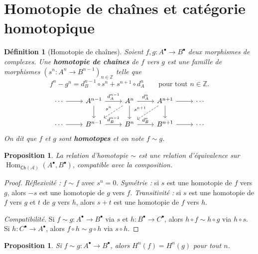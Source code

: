 \documentclass[a4paper,12pt]{book}
\DeclareMathOperator{\Hom}{Hom}
\newcommand{\Z}{\mathbb{Z}}
\newtheorem{proposition}[theoreme]{Proposition}
\newtheorem{definition}[theoreme]{Définition}
\begin{document}
\section{Homotopie de chaînes et catégorie homotopique}%
\label{sec:chain-homotopy}

\begin{definition}[Homotopie de chaînes]\label{def:chain-homotopy}
Soient $f, g \colon A^\bullet \to B^\bullet$ deux morphismes de complexes.
Une \textbf{homotopie de chaînes} de $f$ vers $g$ est une famille de
morphismes $(s^n \colon A^n \to B^{n-1})_{n \in \Z}$ telle que
\[
  f^n - g^n = d_B^{n-1} \circ s^n + s^{n+1} \circ d_A^n
  \qquad \text{pour tout } n \in \Z.
\]
\[
\begin{tikzcd}
\cdots \arrow[r]
& A^{n-1} \arrow[r, "d_A^{n-1}"] \arrow[d]
& A^n \arrow[r, "d_A^n"] \arrow[d] \arrow[dl, dashed, "s^n"']
& A^{n+1} \arrow[r] \arrow[d] \arrow[dl, dashed, "s^{n+1}"']
& \cdots \\
\cdots \arrow[r]
& B^{n-1} \arrow[r, "d_B^{n-1}"]
& B^n \arrow[r, "d_B^n"]
& B^{n+1} \arrow[r]
& \cdots
\end{tikzcd}
\]
On dit que $f$ et $g$ sont \textbf{homotopes} et on
note $f \sim g$.
\end{definition}

\begin{proposition}\label{prop:homotopy-equivalence}
La relation d'homotopie $\sim$ est une relation d'équivalence sur
$\Hom_{\mathsf{Ch}(\mathcal{A})}(A^\bullet, B^\bullet)$, compatible
avec la composition.
\end{proposition}

\begin{proof}
\emph{Réflexivité :} $f \sim f$ avec $s^n = 0$.
\emph{Symétrie :} si $s$ est une homotopie de $f$ vers $g$, alors $-s$ est
une homotopie de $g$ vers $f$.
\emph{Transitivité :} si $s$ est une homotopie de $f$ vers $g$ et $t$ de
$g$ vers $h$, alors $s + t$ est une homotopie de $f$ vers $h$.

\emph{Compatibilité.} Si $f \sim g \colon A^\bullet \to B^\bullet$
via $s$ et $h \colon B^\bullet \to C^\bullet$, alors $h \circ f \sim h \circ g$
via $h \circ s$. Si $h \colon C^\bullet \to A^\bullet$, alors
$f \circ h \sim g \circ h$ via $s \circ h$.
\end{proof}

\begin{proposition}\label{prop:homotopic-maps-cohomology}
Si $f \sim g \colon A^\bullet \to B^\bullet$, alors
$H^n(f) = H^n(g)$ pour tout $n$.
\end{proposition}
\end{document}
